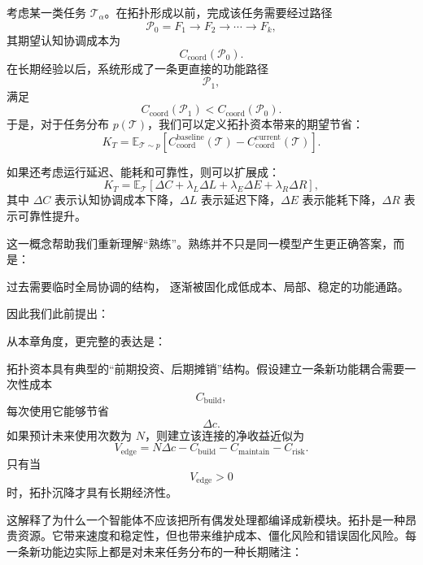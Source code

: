 考虑某一类任务 $\mathcal{T}_{\alpha}$。在拓扑形成以前，完成该任务需要经过路径
\[
\mathcal{P}_{0}
=
F_1
\rightarrow
F_2
\rightarrow
\cdots
\rightarrow
F_k,
\]
其期望认知协调成本为
\[
C_{\mathrm{coord}}
(\mathcal{P}_{0}).
\]
在长期经验以后，系统形成了一条更直接的功能路径
\[
\mathcal{P}_{1},
\]
满足
\[
C_{\mathrm{coord}}
(\mathcal{P}_{1})
<
C_{\mathrm{coord}}
(\mathcal{P}_{0}).
\]
于是，对于任务分布 $p(\mathcal{T})$，我们可以定义拓扑资本带来的期望节省：
\[
K_T
=
\mathbb{E}_{\mathcal{T}\sim p}
\left[
C_{\mathrm{coord}}^{\mathrm{baseline}}(\mathcal{T})
-
C_{\mathrm{coord}}^{\mathrm{current}}(\mathcal{T})
\right].
\]

如果还考虑运行延迟、能耗和可靠性，则可以扩展成：
\[
K_T
=
\mathbb{E}_{\mathcal{T}}
\left[
\Delta C
+
\lambda_L\Delta L
+
\lambda_E\Delta E
+
\lambda_R\Delta R
\right],
\]
其中 $\Delta C$ 表示认知协调成本下降，$\Delta L$ 表示延迟下降，$\Delta E$ 表示能耗下降，$\Delta R$ 表示可靠性提升。

这一概念帮助我们重新理解``熟练''。熟练并不只是同一模型产生更正确答案，而是：
\begin{statementbox}
过去需要临时全局协调的结构，
逐渐被固化成低成本、局部、稳定的功能通路。
\end{statementbox}
因此我们此前提出：
\begin{statementbox}
\centering
{}
\end{statementbox}
从本章角度，更完整的表达是：
\begin{statementbox}
\centering
{}
\end{statementbox}

拓扑资本具有典型的``前期投资、后期摊销''结构。假设建立一条新功能耦合需要一次性成本
\[
C_{\mathrm{build}},
\]
每次使用它能够节省
\[
\Delta c.
\]
如果预计未来使用次数为 $N$，则建立该连接的净收益近似为
\[
V_{\mathrm{edge}}
=
N\Delta c
-
C_{\mathrm{build}}
-
C_{\mathrm{maintain}}
-
C_{\mathrm{risk}}.
\]
只有当
\[
V_{\mathrm{edge}}>0
\]
时，拓扑沉降才具有长期经济性。

这解释了为什么一个智能体不应该把所有偶发处理都编译成新模块。拓扑是一种昂贵资源。它带来速度和稳定性，但也带来维护成本、僵化风险和错误固化风险。每一条新功能边实际上都是对未来任务分布的一种长期赌注：
\begin{statementbox}
\centering
{}
\end{statementbox}

